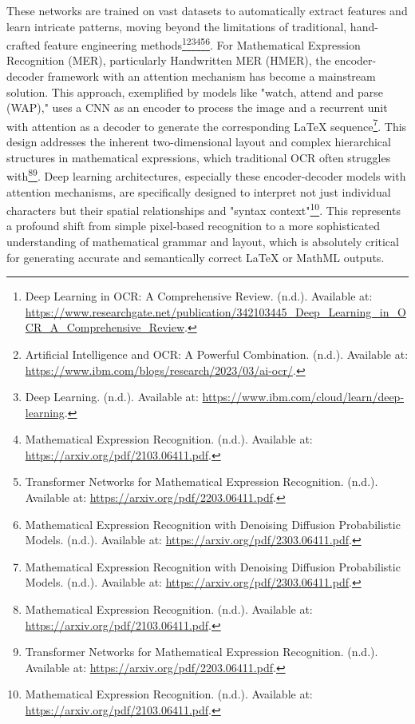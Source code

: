 These networks are trained on vast datasets to automatically extract features and learn intricate patterns, moving beyond the limitations of traditional, hand-crafted feature engineering methods\footnote{Deep Learning in OCR: A Comprehensive Review. (n.d.). Available at: \url{https://www.researchgate.net/publication/342103445_Deep_Learning_in_OCR_A_Comprehensive_Review}.}\footnote{Artificial Intelligence and OCR: A Powerful Combination. (n.d.). Available at: \url{https://www.ibm.com/blogs/research/2023/03/ai-ocr/}.}\footnote{Deep Learning. (n.d.). Available at: \url{https://www.ibm.com/cloud/learn/deep-learning}.}\footnote{Mathematical Expression Recognition. (n.d.). Available at: \url{https://arxiv.org/pdf/2103.06411.pdf}.}\footnote{Transformer Networks for Mathematical Expression Recognition. (n.d.). Available at: \url{https://arxiv.org/pdf/2203.06411.pdf}.}\footnote{Mathematical Expression Recognition with Denoising Diffusion Probabilistic Models. (n.d.). Available at: \url{https://arxiv.org/pdf/2303.06411.pdf}.}. For Mathematical Expression Recognition (MER), particularly Handwritten MER (HMER), the encoder-decoder framework with an attention mechanism has become a mainstream solution. This approach, exemplified by models like "watch, attend and parse (WAP)," uses a CNN as an encoder to process the image and a recurrent unit with attention as a decoder to generate the corresponding LaTeX sequence\footnote{Mathematical Expression Recognition with Denoising Diffusion Probabilistic Models. (n.d.). Available at: \url{https://arxiv.org/pdf/2303.06411.pdf}.}. This design addresses the inherent two-dimensional layout and complex hierarchical structures in mathematical expressions, which traditional OCR often struggles with\footnote{Mathematical Expression Recognition. (n.d.). Available at: \url{https://arxiv.org/pdf/2103.06411.pdf}.}\footnote{Transformer Networks for Mathematical Expression Recognition. (n.d.). Available at: \url{https://arxiv.org/pdf/2203.06411.pdf}.}. Deep learning architectures, especially these encoder-decoder models with attention mechanisms, are specifically designed to interpret not just individual characters but their spatial relationships and "syntax context"\footnote{Mathematical Expression Recognition. (n.d.). Available at: \url{https://arxiv.org/pdf/2103.06411.pdf}.}. This represents a profound shift from simple pixel-based recognition to a more sophisticated understanding of mathematical grammar and layout, which is absolutely critical for generating accurate and semantically correct LaTeX or MathML outputs.

